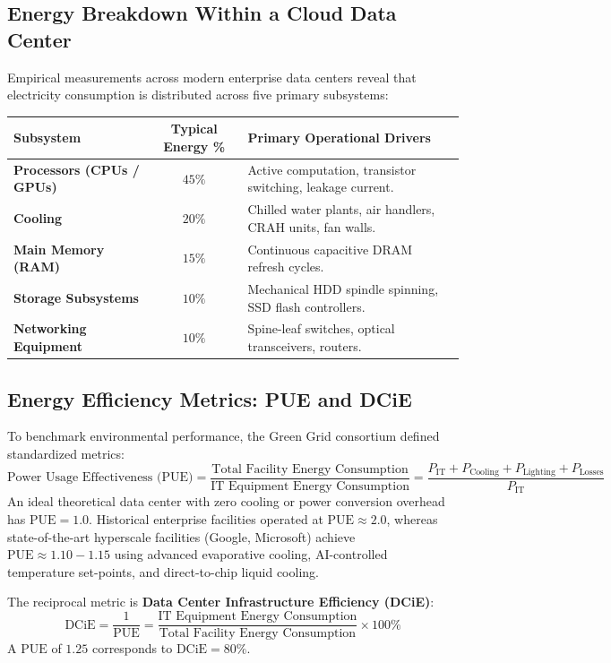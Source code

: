 \subsection{Energy Breakdown Within a Cloud Data Center}
Empirical measurements across modern enterprise data centers reveal that electricity consumption is distributed across five primary subsystems:
\begin{center}
\begin{tabularx}{\textwidth}{>{\bfseries}l c X}
\toprule
Subsystem & Typical Energy \% & Primary Operational Drivers\\
\midrule
Processors (CPUs / GPUs) & $45\%$ & Active computation, transistor switching, leakage current.\\
Cooling & $20\%$ & Chilled water plants, air handlers, CRAH units, fan walls.\\
Main Memory (RAM) & $15\%$ & Continuous capacitive DRAM refresh cycles.\\
Storage Subsystems & $10\%$ & Mechanical HDD spindle spinning, SSD flash controllers.\\
Networking Equipment & $10\%$ & Spine-leaf switches, optical transceivers, routers.\\
\bottomrule
\end{tabularx}
\end{center}

\subsection{Energy Efficiency Metrics: PUE and DCiE}
To benchmark environmental performance, the Green Grid consortium defined standardized metrics:
\begin{equation}
\text{Power Usage Effectiveness (PUE)} = \frac{\text{Total Facility Energy Consumption}}{\text{IT Equipment Energy Consumption}} = \frac{P_{\text{IT}} + P_{\text{Cooling}} + P_{\text{Lighting}} + P_{\text{Losses}}}{P_{\text{IT}}}
\end{equation}
An ideal theoretical data center with zero cooling or power conversion overhead has $\text{PUE} = 1.0$. Historical enterprise facilities operated at $\text{PUE} \approx 2.0$, whereas state-of-the-art hyperscale facilities (Google, Microsoft) achieve $\text{PUE} \approx 1.10 - 1.15$ using advanced evaporative cooling, AI-controlled temperature set-points, and direct-to-chip liquid cooling.

The reciprocal metric is \textbf{Data Center Infrastructure Efficiency (DCiE)}:
\begin{equation}
\text{DCiE} = \frac{1}{\text{PUE}} = \frac{\text{IT Equipment Energy Consumption}}{\text{Total Facility Energy Consumption}} \times 100\%
\end{equation}
A $\text{PUE}$ of $1.25$ corresponds to $\text{DCiE} = 80\%$.

